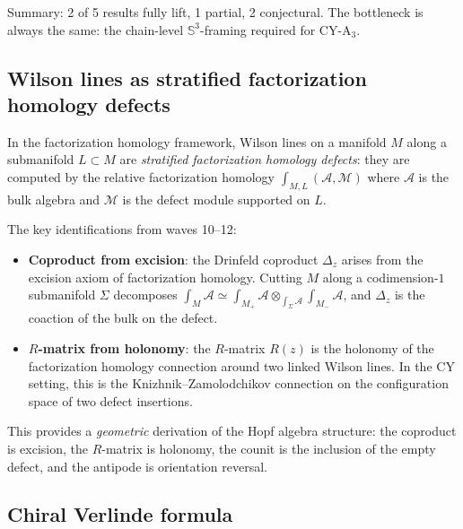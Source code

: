 \documentclass[11pt]{article}
\newcommand{\cA}{\mathcal{A}}
\newcommand{\cM}{\mathcal{M}}
\newcommand{\bS}{\mathbb{S}}
\begin{document}
\noindent Summary: 2 of 5 results fully lift, 1 partial, 2 conjectural.
The bottleneck is always the same: the chain-level $\bS^3$-framing
required for CY-A$_3$.

\subsection{Wilson lines as stratified factorization homology defects}
\label{subsec:wilson-lines-fh}

\begin{observation}[Wilson lines = stratified FH defects]
\label{obs:wilson-fh}
In the factorization homology framework, Wilson lines on a manifold $M$
along a submanifold $L \subset M$ are \emph{stratified factorization
homology defects}: they are computed by the relative factorization
homology $\int_{M, L} (\cA, \cM)$ where $\cA$ is the bulk algebra and
$\cM$ is the defect module supported on $L$.

The key identifications from waves 10--12:
\begin{itemize}
 \item \textbf{Coproduct from excision}: the Drinfeld coproduct
 $\Delta_z$ arises from the excision axiom of factorization homology.
 Cutting $M$ along a codimension-$1$ submanifold $\Sigma$ decomposes
 $\int_M \cA \simeq \int_{M_+} \cA \otimes_{\int_\Sigma \cA} \int_{M_-} \cA$,
 and $\Delta_z$ is the coaction of the bulk on the defect.
 \item \textbf{$R$-matrix from holonomy}: the $R$-matrix $R(z)$
 is the holonomy of the factorization homology connection around two
 linked Wilson lines. In the CY setting, this is the Knizhnik--Zamolodchikov
 connection on the configuration space of two defect insertions.
\end{itemize}
This provides a \emph{geometric} derivation of the Hopf algebra structure:
the coproduct is excision, the $R$-matrix is holonomy, the counit is the
inclusion of the empty defect, and the antipode is orientation reversal.
\end{observation}

\subsection{Chiral Verlinde formula}
\label{subsec:chiral-verlinde}
\end{document}
